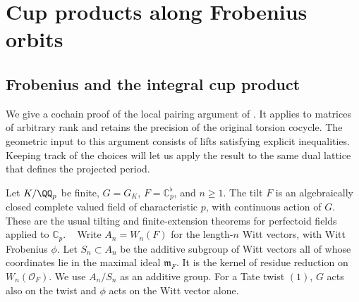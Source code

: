 \documentclass[a4paper,11pt]{article}
\theoremstyle{definition}
\theoremstyle{remark}
\numberwithin{equation}{section}
\begin{document}
\section{Cup products along Frobenius orbits}\label{nav:frobenius-cups}

\subsection{Frobenius and the integral cup product}
\label{sec:cuppath757}
We give a cochain proof of the local pairing argument of
.
It applies to matrices of arbitrary rank and retains the precision
of the original torsion cocycle. The geometric input to this
argument consists of lifts satisfying explicit inequalities.
Keeping track of the choices will let us apply the result to
the same dual lattice that defines the projected period.

Let \(K/\QQ_p\) be finite, \(G=G_K\), \(F=\mathbb C_p^\flat\),
and \(n\ge1\). The tilt \(F\) is an algebraically closed complete
valued field of characteristic \(p\), with continuous action of
\(G\). These are the usual tilting and finite-extension theorems
for perfectoid fields applied to \(\mathbb C_p\).
~\cite{III-II-scholzetilt757}
Write \(A_n=W_n(F)\) for the length-\(n\) Witt vectors, with
Witt Frobenius \(\phi\). Let \(S_n\subset A_n\) be the additive
subgroup of Witt vectors all of whose coordinates lie in the
maximal ideal \(\mathfrak m_F\). It is the kernel of residue
reduction on \(W_n(\mathcal O_F)\). We use \(A_n/S_n\) as an
additive group. For a Tate twist \((1)\), \(G\) acts also on
the twist and \(\phi\) acts on the Witt vector alone.
\end{document}
